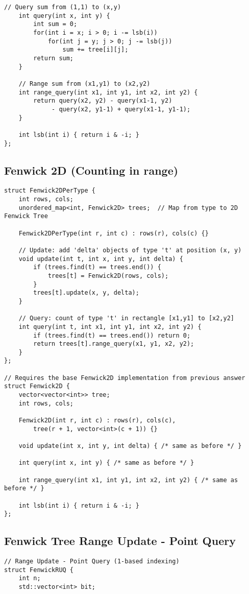 \documentclass[10pt]{article}
\begin{document}
\begin{multicols*}{2}
\begin{lstlisting}[style=compactcpp]
    // Query sum from (1,1) to (x,y)
    int query(int x, int y) {
        int sum = 0;
        for(int i = x; i > 0; i -= lsb(i))
            for(int j = y; j > 0; j -= lsb(j))
                sum += tree[i][j];
        return sum;
    }
    
    // Range sum from (x1,y1) to (x2,y2)
    int range_query(int x1, int y1, int x2, int y2) {
        return query(x2, y2) - query(x1-1, y2) 
             - query(x2, y1-1) + query(x1-1, y1-1);
    }
    
    int lsb(int i) { return i & -i; }
};
\end{lstlisting}

\subsection{Fenwick 2D (Counting in range)}
\begin{lstlisting}[style=compactcpp]
struct Fenwick2DPerType {
    int rows, cols;
    unordered_map<int, Fenwick2D> trees;  // Map from type to 2D Fenwick Tree

    Fenwick2DPerType(int r, int c) : rows(r), cols(c) {}

    // Update: add 'delta' objects of type 't' at position (x, y)
    void update(int t, int x, int y, int delta) {
        if (trees.find(t) == trees.end()) {
            trees[t] = Fenwick2D(rows, cols);
        }
        trees[t].update(x, y, delta);
    }

    // Query: count of type 't' in rectangle [x1,y1] to [x2,y2]
    int query(int t, int x1, int y1, int x2, int y2) {
        if (trees.find(t) == trees.end()) return 0;
        return trees[t].range_query(x1, y1, x2, y2);
    }
};

// Requires the base Fenwick2D implementation from previous answer
struct Fenwick2D {
    vector<vector<int>> tree;
    int rows, cols;
    
    Fenwick2D(int r, int c) : rows(r), cols(c), 
        tree(r + 1, vector<int>(c + 1)) {}
    
    void update(int x, int y, int delta) { /* same as before */ }
    
    int query(int x, int y) { /* same as before */ }
    
    int range_query(int x1, int y1, int x2, int y2) { /* same as before */ }
    
    int lsb(int i) { return i & -i; }
};
\end{lstlisting}

\subsection{Fenwick Tree Range Update - Point Query}
\begin{lstlisting}[style=compactcpp]
// Range Update - Point Query (1-based indexing)
struct FenwickRUQ {
    int n;
    std::vector<int> bit;
    

\end{lstlisting}
\end{multicols*}
\end{document}
